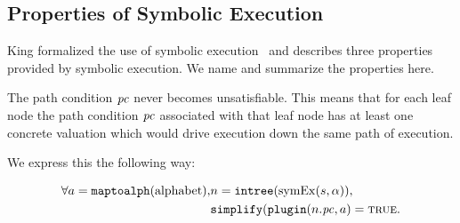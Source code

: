 



\subsection{Properties of Symbolic Execution}
King formalized the use of symbolic execution~\cite{king1976symbolic} and describes three
properties provided by symbolic execution. We name and summarize the properties
here.
\setcounter{property}{0}
\renewcommand{\theproperty}{K.\arabic{property}}
\begin{property}
  \label{prop:kingsound}
  The path condition $\mathit{pc}$ never becomes unsatisfiable. This means that for each
  leaf node the path condition $\mathit{pc}$ associated with that leaf node has at
  least one concrete valuation which would drive execution down the same path of
  execution.
  
  We express this the following way: 
  
  \begin{align*}
  \forall a = \mathtt{maptoalph}(\mathrm{alphabet}), & n =
\mathtt{intree}(\mathrm{symEx}(s,\alpha)), \\
 & \mathtt{simplify}(\mathtt{plugin}(n.\mathit{pc},a) = \mathtt{\textsc{true}}.
  \end{align*}
  
\end{property}


